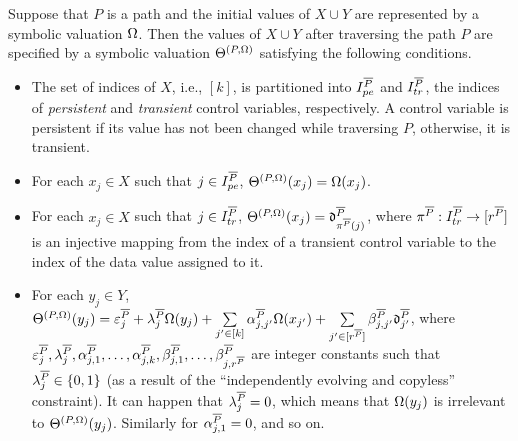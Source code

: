 
\begin{proposition}\label{prop-sum-path}
Suppose that $P$ is a path and the initial values of $X \cup Y$ are represented by a symbolic valuation $\Omega$. Then the values of $X \cup Y$ after traversing the path $P$ are specified by a symbolic valuation $\Theta^{(P,\Omega)}$ satisfying the following conditions.
\begin{itemize}
\item The set of indices of $X$, i.e., $[k]$, is partitioned into $I^{\overline{P}}_{pe}$ and $I^{\overline{P}}_{tr}$, the indices of \emph{persistent} and \emph{transient} control variables, respectively. A control variable is persistent if its value has not been changed while traversing $P$, otherwise, it is transient.
\item For each $x_j\in X$ such that $j\in I^{\overline{P}}_{pe}$, $\Theta^{(P,\Omega)}(x_j)=\Omega(x_j)$.
%
\item  For each $x_j\in X$ such that $j\in I^{\overline{P}}_{tr}$,
$\Theta^{(P,\Omega)}(x_j)=\mathfrak{d}^{\overline{P}}_{\pi^{\overline{P}}(j)}$, where $\pi^{\overline{P}}: I^{\overline{P}}_{tr} \rightarrow [r^{\overline{P}}]$ is an injective mapping from the index of a transient control variable to the index of the data value assigned to it.
% 
\item For each $y_j \in Y$, 
$
 \Theta^{(P,\Omega)}(y_j)  =
 \varepsilon^{\overline{P}}_{j} + 
 \lambda^{\overline{P}}_j \Omega(y_j)  + 
  \sum\limits_{j'\in [k]}\alpha^{\overline{P}}_{j,j'}\Omega(x_{j'}) +
  \sum\limits_{j'\in [r^{\overline{P}}]}\beta^{\overline{P}}_{j,j'} \mathfrak{d}^{\overline{P}}_{j'}$,
where $\varepsilon^{\overline{P}}_j,\lambda^{\overline{P}}_j, \alpha^{\overline{P}}_{j,1},\dots,\alpha^{\overline{P}}_{j,k}, \beta^{\overline{P}}_{j,1},\dots,\beta^{\overline{P}}_{j,r^{\overline{P}}}$ are integer constants such that $\lambda^{\overline{P}}_{j} \in \{0,1\}$ (as a result of the ``independently evolving and copyless'' constraint).  It can happen that $\lambda^{\overline{P}}_j =0$,  which means that $\Omega(y_j)$ is irrelevant to $\Theta^{(P,\Omega)}(y_j)$. Similarly for $\alpha^{\overline{P}}_{j,1}=0$, and so on.
\end{itemize}
\end{proposition}
